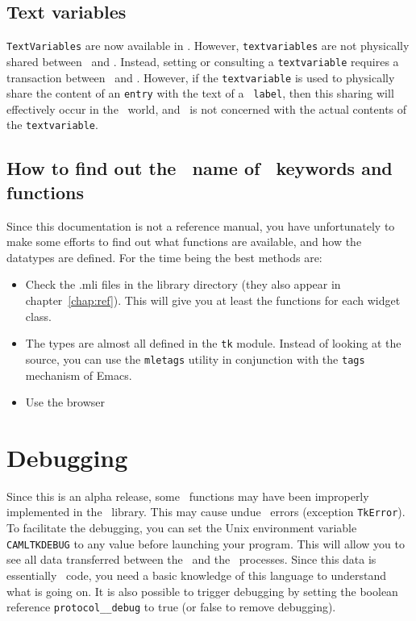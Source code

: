 \subsection{Text variables}
\verb|TextVariables| are now available in \caml\tk. However,
\verb|textvariables| are not physically shared between \caml\ and \tk.
Instead, setting or consulting a \verb|textvariable| requires a transaction
between \caml\ and \tk. However, if the \verb|textvariable| is used to
physically share the content of an {\tt entry} with the text of a {\tt
label}, then this sharing will effectively occur in the \tk\ world, and
\caml\ is not concerned with the actual contents of the \verb|textvariable|.

\subsection{How to find out the \caml\ name of \tk\ keywords and functions}
Since this documentation is not a reference manual, you have unfortunately
to make some efforts to find out what functions are available, and how the
datatypes are defined. For the time being the best methods are:
\begin{itemize}
\item Check the .mli files in the library directory (they also appear in
chapter~\ref{chap:ref}). This will give you at
least the functions for each widget class.
\item The types are almost all defined in the \verb|tk| module. Instead of
looking at the source, you can use the {\tt mletags} utility in conjunction
with the {\tt tags} mechanism of Emacs. 
\item Use the browser
\end{itemize} 

\section{Debugging}
Since this is an alpha release, some \tk\ functions may have been improperly
implemented in the \caml\ library. This may cause undue \tk\ errors
(exception \verb|TkError|). To facilitate the debugging, you can set the
Unix environment variable \verb|CAMLTKDEBUG| to any value before launching
your program. This will allow you to see all
data transferred between the \caml\ and the \tk\ processes. Since this data is
essentially \tcl\tk\ code, you need a basic knowledge of this language to
understand what is going on.
It is also possible to trigger debugging by setting the boolean reference
\verb|protocol__debug| to true (or false to remove debugging).
